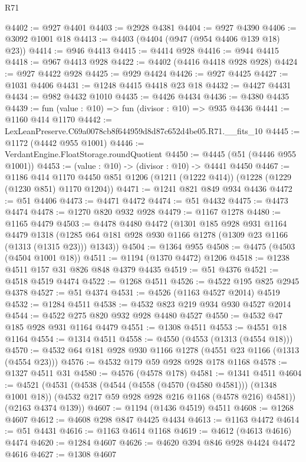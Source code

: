 \begin{lexlean}{R71}
\begin{coremodule}
@4402 := @927 @4401
@4403 := @2928 @4381
@4404 := @927 @4390
@4406 := @3092 @1001 @18
@4413 := @4403 (@4404 (@947 (@954 @4406 @139 @18) @23))
@4414 := @946 @4413
@4415 := @4414 @928
@4416 := @944 @4415
@4418 := @967 @4413 @928
@4422 := @4402 (@4416 @4418 @928 @928)
@4424 := @927 @4422 @928
@4425 := @929 @4424
@4426 := @927 @4425
@4427 := @1031 @4406
@4431 := @1248 @4415 @4418 @23 @18
@4432 := @4427 @4431
@4434 := @982 @4432 @1010
@4435 := @4426 @4434
@4436 := @4380 @4435
@4439 := fun (value : @10) => fun (divisor : @10) => @935 @4436
@4441 := @1160 @414 @1170
@4442 := LexLeanPreserve.C69a0078cb8f644959d8d87c652d4be05.R71.__fits_10
@4445 := @1172 (@4442 @955 @1001)
@4446 := VerdantEngine.FloatStorage.roundQuotient
@4450 := @4445 (@51 (@4446 @955 @1001))
@4453 := (value : @10) -> (divisor : @10) -> @4441 @4450
@4467 := @1186
    @414
    @1170
    @4450
    @851
    @1206
    (@1211 (@1222 @414))
    (@1228 (@1229 (@1230 @851) @1170 @1204))
@4471 := @1241 @821 @849 @934 @4436
@4472 := @51 @4406
@4473 := @4471 @4472
@4474 := @51 @4432
@4475 := @4473 @4474
@4478 := @1270 @820 @932 @928
@4479 := @1167 @1278
@4480 := @1165 @4479
@4503 := @4478
    @4480
    @4472
    (@1301
      @185
      @928
      @931
      @1164
      @4479
      @1318
      (@1285 @64 @181 @928 @930 @1166 @1278 (@1309 @23 @1166 (@1313 (@1315 @23))) @1343))
@4504 := @1364 @955
@4508 := @4475 (@4503 (@4504 @1001 @18))
@4511 := @1194 (@1370 @4472) @1206
@4518 := @1238 @4511 @157 @31 @826 @848 @4379 @4435
@4519 := @51 @4376
@4521 := @4518 @4519 @4474
@4522 := @1268 @4511
@4526 := @4522 @195 @825 @2945 @4378
@4527 := @51 @4374
@4531 := @4526 (@1163 @4527 @2014) @4519
@4532 := @1284 @4511
@4538 := @4532 @823 @219 @934 @930 @4527 @2014
@4544 := @4522 @275 @820 @932 @928 @4480 @4527
@4550 := @4532 @47 @185 @928 @931 @1164 @4479
@4551 := @1308 @4511
@4553 := @4551 @18 @1164
@4554 := @1314 @4511
@4558 := @4550 (@4553 (@1313 (@4554 @18)))
@4570 := @4532 @64 @181 @928 @930 @1166 @1278 (@4551 @23 @1166 (@1313 (@4554 @23)))
@4576 := @4532 @179 @59 @928 @928 @178 @1168
@4578 := @1327 @4511 @31
@4580 := @4576 (@4578 @178)
@4581 := @1341 @4511
@4604 := @4521
    (@4531
      (@4538
        (@4544 (@4558 (@4570 (@4580 @4581))) (@1348 @1001 @18))
        (@4532 @217 @59 @928 @928 @216 @1168 (@4578 @216) @4581))
      (@2163 @4374 @139))
@4607 := @1194 (@1436 @4519) @4511
@4608 := @1268 @4607
@4612 := @4608 @298 @847 @4425 @4434
@4613 := @1163 @4472
@4614 := @51 @4431
@4616 := @1163 @4614 @1168
@4619 := @4612 (@4613 @4616) @4474
@4620 := @1284 @4607
@4626 := @4620 @394 @846 @928 @4424 @4472 @4616
@4627 := @1308 @4607

\end{coremodule}
\end{lexlean}
